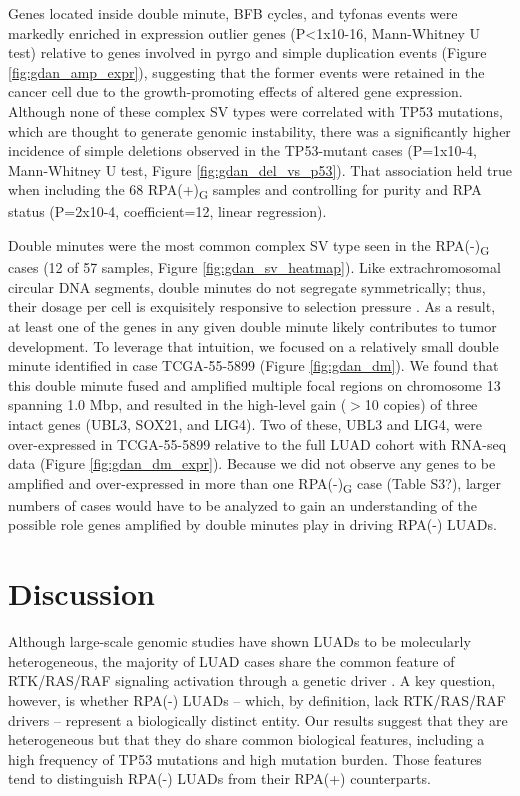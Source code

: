 \documentclass[phd,tocprelim]{cornell}
\begin{document}
Genes located inside double minute, BFB cycles, and tyfonas events were markedly enriched in expression outlier genes (P<1x10-16, Mann-Whitney U test) relative to genes involved in pyrgo and simple duplication events (Figure \ref{fig:gdan_amp_expr}), suggesting that the former events were retained in the cancer cell due to the growth-promoting effects of altered gene expression. Although none of these complex SV types were correlated with TP53 mutations, which are thought to generate genomic instability, there was a significantly higher incidence of simple deletions observed in the TP53-mutant cases (P=1x10-4, Mann-Whitney U test, Figure \ref{fig:gdan_del_vs_p53}). That association held true when including the 68 RPA(+)\textsubscript{G} samples and controlling for purity and RPA status (P=2x10-4, coefficient=12, linear regression).

Double minutes were the most common complex SV type seen in the RPA(-)\textsubscript{G} cases (12 of 57 samples, Figure \ref{fig:gdan_sv_heatmap}). Like extrachromosomal circular DNA segments, double minutes do not segregate symmetrically; thus, their dosage per cell is exquisitely responsive to selection pressure \cite{Verhaak2019,Wu2019-ap}. As a result, at least one of the genes in any given double minute likely contributes to tumor development. To leverage that intuition, we focused on a relatively small double minute identified in case TCGA-55-5899 (Figure \ref{fig:gdan_dm}). We found that this double minute fused and amplified multiple focal regions on chromosome 13 spanning 1.0 Mbp, and resulted in the high-level gain ($>$10 copies) of three intact genes (UBL3, SOX21, and LIG4). Two of these, UBL3 and LIG4, were over-expressed in TCGA-55-5899 relative to the full LUAD cohort with RNA-seq data (Figure \ref{fig:gdan_dm_expr}). Because we did not observe any genes to be amplified and over-expressed in more than one RPA(-)\textsubscript{G} case (Table S3?), larger numbers of cases would have to be analyzed to gain an understanding of the possible role genes amplified by double minutes play in driving RPA(-) LUADs.

\section{Discussion}
Although large-scale genomic studies have shown LUADs to be molecularly heterogeneous, the majority of LUAD cases share the common feature of RTK/RAS/RAF signaling activation through a genetic driver \cite{Desai2014-qe,Swanton2016-lg}. A key question, however, is whether RPA(-) LUADs – which, by definition, lack RTK/RAS/RAF drivers – represent a biologically distinct entity. Our results suggest that they are heterogeneous but that they do share common biological features, including a high frequency of TP53 mutations and high mutation burden. Those features tend to distinguish RPA(-) LUADs from their RPA(+) counterparts.
\end{document}
